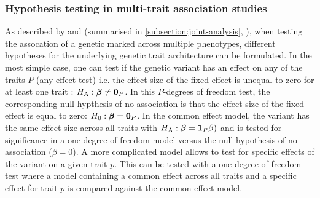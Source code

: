 \subsubsection{Hypothesis testing in multi-trait association studies}
\label{subsubsection:model-design}
As described by \citet{Jiang1995} and \citet{Korte2012} (summarised in \cref{subsection:joint-analysis}, ), when testing the assocation of a genetic marked across multiple phenotypes, different hypotheses for the underlying genetic trait architecture can be formulated. In the most simple case, one can test if the genetic variant has an effect on any of the traits \(P\) (any effect test) i.e. the effect size of the fixed effect \tmat{\beta} is unequal to zero for at least one trait : \(H_\text{A}: \boldsymbol{\mathbf{\beta}} \ne \boldsymbol{\mathbf{0}}_P\).  In this \(P\)-degrees of freedom test, the corresponding null hypthesis of no association is that the effect size of the fixed effect is equal to zero: \(H_0:\boldsymbol{\mathbf{\beta}}  = \boldsymbol{\mathbf{0}}_P\). In the common effect model, the variant has the same effect size across all traits with \(H_\text{A}: \boldsymbol{\mathbf{\beta}}  = \boldsymbol{\mathbf{1}}_P\beta)\) and is tested for significance in a one degree of freedom model versus the null hypothesis of no association (\(\beta  = 0\)). A more complicated model allows to test for specific effects of the variant on a given trait \(p\). This can be tested with a one degree of freedom test where a model containing a common effect across all traits and a specific effect for trait \(p\) is compared against the common effect model.